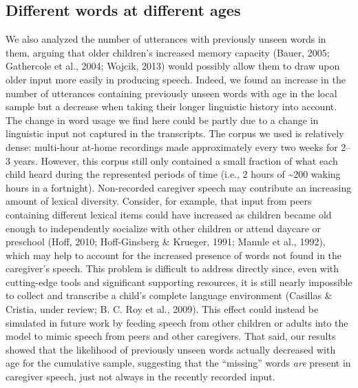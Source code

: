 \documentclass[man,mask,floatsintext]{apa6}
\theoremstyle{definition}
\theoremstyle{definition}
\theoremstyle{definition}
\theoremstyle{remark}
\begin{document}
\subsection{Different words at different
ages}\label{different-words-at-different-ages}

We also analyzed the number of utterances with previously unseen words
in them, arguing that older children's increased memory capacity (Bauer,
2005; Gathercole et al., 2004; Wojcik, 2013) would possibly allow them
to draw upon older input more easily in producing speech. Indeed, we
found an increase in the number of utterances containing previously
unseen words with age in the local sample but a decrease when taking
their longer linguistic history into account. The change in word usage
we find here could be partly due to a change in linguistic input not
captured in the transcripts. The corpus we used is relatively dense:
multi-hour at-home recordings made approximately every two weeks for
2--3 years. However, this corpus still only contained a small fraction
of what each child heard during the represented periods of time (i.e., 2
hours of \textasciitilde{}200 waking hours in a fortnight). Non-recorded
caregiver speech may contribute an increasing amount of lexical
diversity. Consider, for example, that input from peers containing
different lexical items could have increased as children became old
enough to independently socialize with other children or attend daycare
or preschool (Hoff, 2010; Hoff-Ginsberg \& Krueger, 1991; Mannle et al.,
1992), which may help to account for the increased presence of words not
found in the caregiver's speech. This problem is difficult to address
directly since, even with cutting-edge tools and significant supporting
resources, it is still nearly impossible to collect and transcribe a
child's complete language environment (Casillas \& Cristia, under
review; B. C. Roy et al., 2009). This effect could instead be simulated
in future work by feeding speech from other children or adults into the
model to mimic speech from peers and other caregivers. That said, our
results showed that the likelihood of previously unseen words actually
decreased with age for the cumulative sample, suggesting that the
\enquote{missing} words \emph{are} present in caregiver speech, just not
always in the recently recorded input.
\end{document}
